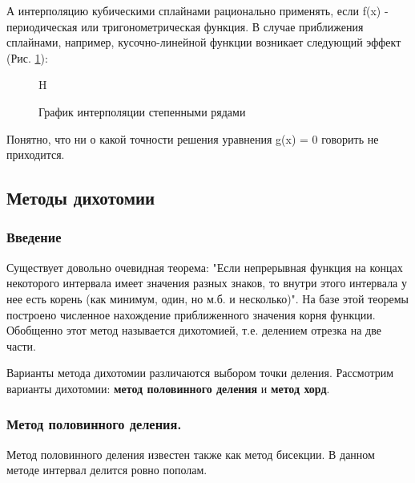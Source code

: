 \documentclass{article}
\begin{document}
			А интерполяцию кубическими сплайнами рационально применять, если f(x) - периодическая или тригонометрическая функция. В случае приближения сплайнами, например, кусочно-линейной функции возникает следующий эффект (Рис. \ref{fig:dix6}):
			\begin{figure}{H}
					\caption{График интерполяции степенными рядами}
					\label{fig:dix6}
			\end{figure}
			
			Понятно, что ни о какой точности решения уравнения g(x) = 0 говорить не приходится.
			
		\subsection{Методы дихотомии}
			
			\subsubsection{Введение}
			
				Существует довольно очевидная теорема: "Если непрерывная функция на концах некоторого интервала имеет значения разных знаков, то внутри этого интервала у нее есть корень (как минимум, один, но м.б. и несколько)". На базе этой теоремы построено численное нахождение приближенного значения корня функции. Обобщенно этот метод называется дихотомией, т.е. делением отрезка на две части. 
				
				Варианты метода дихотомии различаются выбором точки деления. Рассмотрим варианты дихотомии: \textbf{метод половинного деления} и \textbf{метод хорд}.\\
				
				\subsubsection{Метод половинного деления.}
				Метод половинного деления известен также как метод бисекции. В данном методе интервал делится ровно пополам.
				
\end{document}
